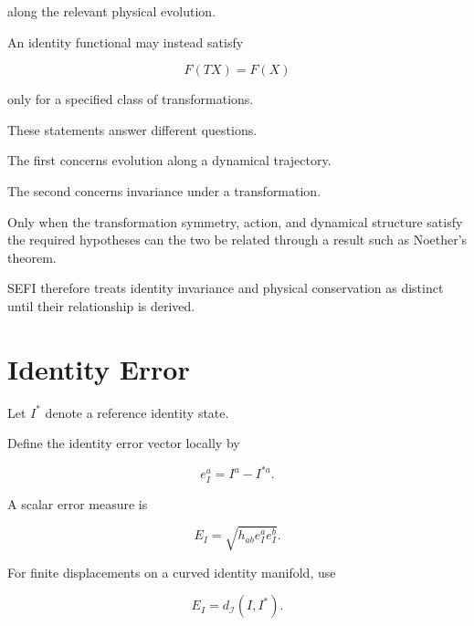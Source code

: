 \documentclass[12pt,oneside]{book}
\begin{document}
along the relevant physical evolution.

An identity functional may instead satisfy

\begin{equation}
    F(TX)
    =
    F(X)
\end{equation}

only for a specified class of transformations.

These statements answer different questions.

The first concerns evolution along a dynamical trajectory.

The second concerns invariance under a transformation.

Only when the transformation symmetry, action, and dynamical
structure satisfy the required hypotheses can the two be related
through a result such as Noether's theorem.

SEFI therefore treats identity invariance and physical
conservation as distinct until their relationship is derived.


\section{Identity Error}
\label{sec:identity-error}

Let \(I^\ast\) denote a reference identity state.

Define the identity error vector locally by

\begin{equation}
    e_I^a
    =
    I^a-I^{\ast a}.
    \label{eq:identity-error-vector}
\end{equation}

A scalar error measure is

\begin{equation}
    E_I
    =
    \sqrt{
        h_{ab}
        e_I^a e_I^b
    }.
    \label{eq:identity-error-measure}
\end{equation}

For finite displacements on a curved identity manifold, use

\begin{equation}
    E_I
    =
    d_{\mathcal{I}}
    \left(
        I,
        I^\ast
    \right).
    \label{eq:intrinsic-identity-error}
\end{equation}
\end{document}
